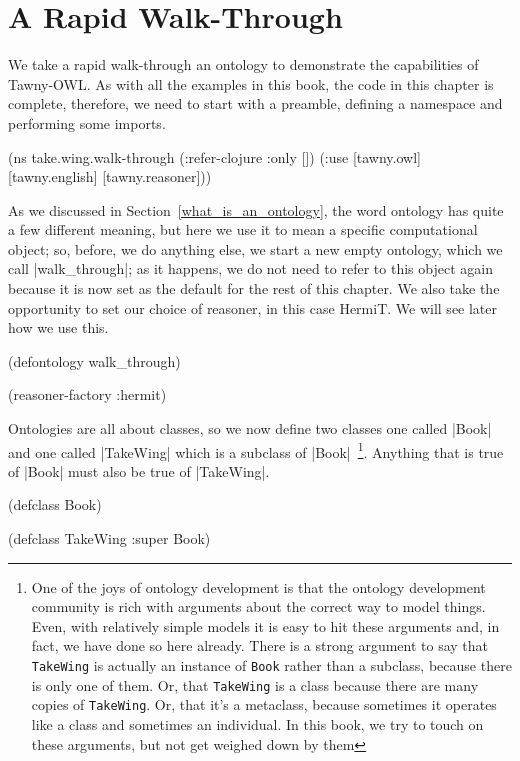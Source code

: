 
\chapter{A Rapid Walk-Through}
\label{cha:rapid-walk-through}

We take a rapid walk-through an ontology to demonstrate the capabilities of
Tawny-OWL. As with all the examples in this book, the code in this chapter is
complete, therefore, we need to start with a preamble, defining a namespace
and performing some imports.

\begin{tawny}
(ns take.wing.walk-through
  (:refer-clojure :only [])
  (:use [tawny.owl]
        [tawny.english]
        [tawny.reasoner]))
\end{tawny}

As we discussed in Section~\ref{what_is_an_ontology}, the word ontology has
quite a few different meaning, but here we use it to mean a specific
computational object; so, before, we do anything else, we start a new empty
ontology, which we call |walk_through|; as it happens, we do not need to refer
to this object again because it is now set as the default for the rest of this
chapter. We also take the opportunity to set our choice of reasoner, in this
case HermiT. We will see later how we use this.

\begin{tawny}
(defontology walk_through)

(reasoner-factory :hermit)
\end{tawny}

Ontologies are all about classes, so we now define two classes one called
|Book| and one called |TakeWing| which is a subclass of |Book|~\footnote{One
  of the joys of ontology development is that the ontology development
  community is rich with arguments about the correct way to model things.
  Even, with relatively simple models it is easy to hit these arguments and,
  in fact, we have done so here already. There is a strong argument to say
  that \lstinline{TakeWing} is actually an instance of \lstinline{Book} rather
  than a subclass, because there is only one of them. Or, that
  \lstinline{TakeWing} is a class because there are many copies of \lstinline{TakeWing}.
  Or, that it's a metaclass, because sometimes it operates like a class and
  sometimes an individual. In this book, we try to touch on these arguments,
  but not get weighed down by them}. Anything that is true of |Book| must also
be true of |TakeWing|.

\begin{tawny}
(defclass Book)

(defclass TakeWing
  :super Book)
\end{tawny}

